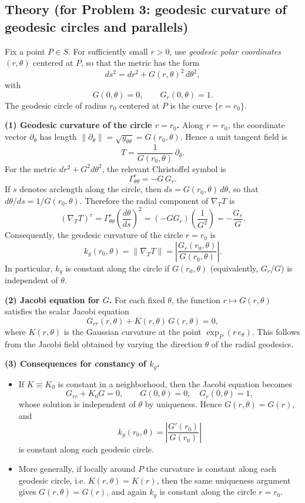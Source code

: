 \documentclass[12pt,a4paper]{article}
\theoremstyle{plain}
\theoremstyle{definition}      %
\begin{document}
\subsection*{Theory (for Problem 3: geodesic curvature of geodesic circles and parallels)}

Fix a point \(P\in S\). For sufficiently small \(r>0\), use \emph{geodesic polar coordinates}
\((r,\theta)\) centered at \(P\), so that the metric has the form
\[
ds^{2}=dr^{2}+G(r,\theta)^{2}\,d\theta^{2},
\]
with
\[
G(0,\theta)=0,\qquad G_{r}(0,\theta)=1.
\]
The geodesic circle of radius \(r_{0}\) centered at \(P\) is the curve \(\{r=r_{0}\}\).

\medskip
\noindent\textbf{(1) Geodesic curvature of the circle \(r=r_{0}\).}
Along \(r=r_{0}\), the coordinate vector \(\partial_{\theta}\) has length
\(\|\partial_{\theta}\|=\sqrt{g_{\theta\theta}}=G(r_{0},\theta)\). Hence a unit tangent field is
\[
T=\frac{1}{G(r_{0},\theta)}\,\partial_{\theta}.
\]
For the metric \(dr^{2}+G^{2}d\theta^{2}\), the relevant Christoffel symbol is
\[
\Gamma^{r}_{\theta\theta}=-G\,G_{r}.
\]
If \(s\) denotes arclength along the circle, then \(ds=G(r_{0},\theta)\,d\theta\), so that
\(d\theta/ds=1/G(r_{0},\theta)\). Therefore the radial component of \(\nabla_{T}T\) is
\[
(\nabla_{T}T)^{r}=\Gamma^{r}_{\theta\theta}\left(\frac{d\theta}{ds}\right)^{2}
=(-GG_{r})\left(\frac{1}{G^{2}}\right)=-\frac{G_{r}}{G}.
\]
Consequently, the geodesic curvature of the circle \(r=r_{0}\) is
\[
k_{g}(r_{0},\theta)=\|\nabla_{T}T\|=\left|\frac{G_{r}(r_{0},\theta)}{G(r_{0},\theta)}\right|.
\]
In particular, \(k_{g}\) is constant along the circle if \(G(r_{0},\theta)\) (equivalently,
\(G_{r}/G\)) is independent of \(\theta\).

\medskip
\noindent\textbf{(2) Jacobi equation for \(G\).}
For each fixed \(\theta\), the function \(r\mapsto G(r,\theta)\) satisfies the scalar Jacobi equation
\[
G_{rr}(r,\theta)+K(r,\theta)\,G(r,\theta)=0,
\]
where \(K(r,\theta)\) is the Gaussian curvature at the point \(\exp_{P}(r\,e_{\theta})\).
This follows from the Jacobi field obtained by varying the direction \(\theta\) of the radial geodesics.

\medskip
\noindent\textbf{(3) Consequences for constancy of \(k_g\).}
\begin{itemize}
	\item If \(K\equiv K_{0}\) is constant in a neighborhood, then the Jacobi equation becomes
	\[
	G_{rr}+K_{0}G=0,\qquad G(0,\theta)=0,\quad G_{r}(0,\theta)=1,
	\]
	whose solution is independent of \(\theta\) by uniqueness. Hence \(G(r,\theta)=G(r)\), and
	\[
	k_{g}(r_{0},\theta)=\left|\frac{G'(r_{0})}{G(r_{0})}\right|
	\]
	is constant along each geodesic circle.
	\item More generally, if locally around \(P\) the curvature is constant along each geodesic circle,
	i.e. \(K(r,\theta)=K(r)\), then the same uniqueness argument gives \(G(r,\theta)=G(r)\), and again
	\(k_{g}\) is constant along the circle \(r=r_{0}\).
\end{itemize}
\end{document}
